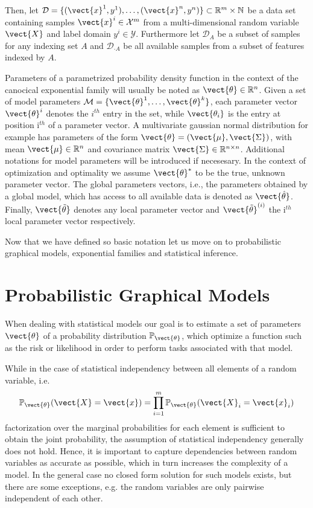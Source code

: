     Then, let $\mathcal{D} = \{(\vect{x}^1, y^1), \ldots, (\vect{x}^n, y^n)\} \subset \mathbb{R}^m \times \mathbb{N}$ be a data set containing samples $\vect{x}^i \in \mathcal{X}^m$ from a multi-dimensional random variable $\vect{X}$ and label domain $y^i \in \mathcal{Y}$.
    Furthermore let $\mathcal{D}_A$ be a subset of samples for any indexing set $A$ and $\mathcal{D}_{\cdot A}$ be all available samples from a subset of features indexed by $A$.  

    Parameters of a parametrized probability density function in the context of the canocical exponential family will usually be noted as $\vect{\theta} \in \mathbb{R}^n$.
    Given a set of model parameters $\mathcal{M} = \{\vect{\theta}^1,  \ldots, \vect{\theta}^k\}$, each parameter vector $\vect{\theta}^i$ denotes the $i^{th}$ entry in the set, while $\vect{\theta_i}$ is the entry at position i$^{th}$ of a parameter vector.
    A multivariate gaussian normal distribution for example has parameters of the form $\vect{\theta} = (\vect{\mu}, \vect{\Sigma})$, with mean $\vect{\mu} \in \mathbb{R}^{n}$ and covariance matrix $\vect{\Sigma} \in \mathbb{R}^{n \times n}$.
    Additional notations for model parameters will be introduced if necesesary.
    In the context of optimization and optimality we assume $\vect{\theta}^*$ to be the true, unknown parameter vector.
    The global parameters vectors, i.e., the parameters obtained by a global model, which has access to all available data is denoted as  $\vect{\hat{\theta}}$.
    Finally, $\vect{\tilde{\theta}}$ denotes any local parameter vector and $\vect{\tilde{\theta}}^{(i)}$ the i$^{th}$ local parameter vector respectively.

    Now that we have defined so basic notation let us move on to probabilistic graphical models, exponential families and statistical inference.
\section{Probabilistic Graphical Models}
\label{sec:pgm}
When dealing with statistical models our goal is to estimate a set of parameters $\vect{\theta}$ of a probability distribution $\mathbb{P}_{\vect{\theta}}$, which optimize a function such as the risk or likelihood in order to perform tasks associated with that model.

While in the case of statistical independency between all elements of a random variable, i.e.
\begin{equation}
    \mathbb{P}_{\vect{\theta}}(\vect{X} = \vect{x}) = \prod_{i=1}^m \mathbb{P}_{\vect{\theta}}(\vect{X}_i = \vect{x}_i)
\end{equation}
factorization over the marginal probabilities for each element is sufficient to obtain the joint probability, the assumption of statistical independency generally does not hold.
Hence, it is important to capture dependencies between random variables as accurate as possible, which in turn increases the complexity of a model.
In the general case no closed form solution for such models exists, but there are some exceptions, e.g. the random variables are only pairwise independent of each other.

